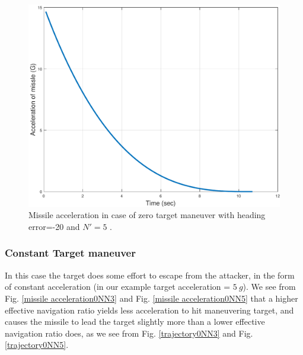 \begin{figure}[H]
	\centering
	\includegraphics[scale = 0.57]{fig/MissileAccelerationXNT0HE20N5.pdf}
	\caption{Missile acceleration in case of zero target maneuver with heading error=-20 and $N'=5$ .}
	\label{missile acceleration20N5}
\end{figure}


\subsubsection{Constant Target maneuver}
In this case the target does some effort to escape from the attacker, in the form of constant acceleration (in our example target acceleration = $5\ g$).
We see from Fig. \ref{missile acceleration0NN3} and Fig. \ref{missile acceleration0NN5} that a higher effective navigation ratio yields less acceleration to hit maneuvering target, and causes the missile to lead the target slightly more than a lower effective navigation ratio does, as we see from Fig. \ref{trajectory0NN3} and Fig. \ref{trajectory0NN5}.



